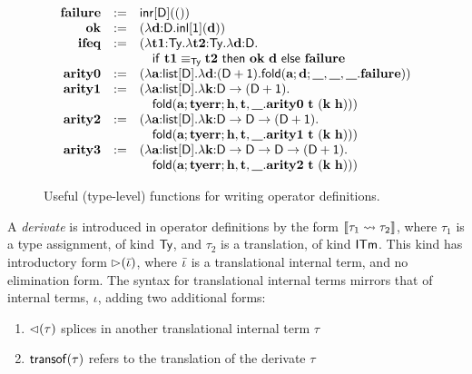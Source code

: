 \begin{figure}[t]
\small
\[
\begin{array}{rcl}
\tvar{failure} & := & \tinr{\kDen}{\tunit}\\
\tvar{ok} & := & (\tlam{d}{\kDen}{\tinl{\kunit}{\tvar{d}}})\\
\tvar{ifeq} & := & (\tlam{t1}{\kTypeBlur}{\tlam{t2}{\kTypeBlur}{\tlam{d}{\kDen}{
	\\& & \quad \tifeq{\tvar{t1}}{\tvar{t2}}{\kTypeBlur}{\tvar{ok}~\tvar{d}}{\tvar{failure}}\\
\tvar{arity0} & := & (\tlam{a}{\klist{\kDen}}{\tlam{d}{(\ksum{\kDen}{\kunit})}{\tfold{\tvar{a}}{\tvar{d}}{\_}{\_}{\_}{\tvar{failure}}}})\\
\tvar{arity1} & := & (\tlam{a}{\klist{\kDen}}{\tlam{k}{\karrow{\kDen}{(\ksum{\kDen}{\kunit})}}{
	\\ & & \quad \tfold{\tvar{a}}{\tvar{tyerr}}{h}{t}{\_}{
 \tvar{arity0}~\tvar{t}~(\tvar{k}~\tvar{h})}}})\\
\tvar{arity2} & := & (\tlam{a}{\klist{\kDen}}{\tlam{k}{\karrow{\kDen}{\karrow{\kDen}{(\ksum{\kDen}{\kunit})}}}{
	\\ & & \quad \tfold{\tvar{a}}{\tvar{tyerr}}{h}{t}{\_}{
 \tvar{arity1}~\tvar{t}~(\tvar{k}~\tvar{h})}}})\\
 \tvar{arity3} & := & (\tlam{a}{\klist{\kDen}}{\tlam{k}{\karrow{\kDen}{\karrow{\kDen}{\karrow{\kDen}{(\ksum{\kDen}{\kunit})}}}}{
	\\ & & \quad \tfold{\tvar{a}}{\tvar{tyerr}}{h}{t}{\_}{
 \tvar{arity2}~\tvar{t}~(\tvar{k}~\tvar{h})}}})
}}}
\end{array}
\]
\caption{\small Useful (type-level) functions for writing operator definitions.}
\label{helpers}
\end{figure}

A \emph{derivate} is introduced in operator definitions by the form $\tden{\tau_2}{\tau_1}$, where $\tau_1$ is a type assignment, of kind $\kTypeBlur$, and $\tau_2$ is a translation, of kind $\kITerm$. This kind has introductory form $\titerm{\ibar}$, where $\ibar$ is a translational internal term, and no elimination form. The syntax for translational internal terms mirrors that of internal terms, $\iota$, adding two additional forms:
\begin{enumerate}
\item $\iup{\tau}$ splices in another translational internal term $\tau$
\item $\itransof{\tau}$ refers to the translation of the derivate $\tau$
\end{enumerate}

